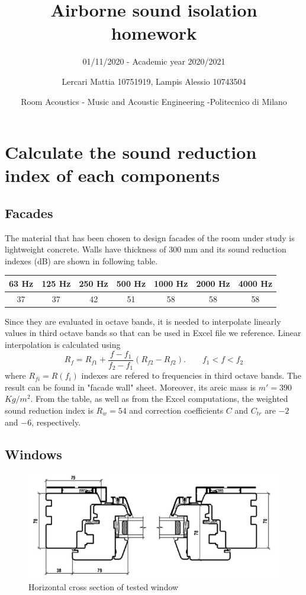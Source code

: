 \documentclass[]{scrartcl}
\title{Airborne sound isolation homework}
\date{Room Acoustics - Music and Acoustic Engineering -Politecnico di Milano}
\author{Lercari Mattia 10751919, Lampis Alessio 10743504}
\subtitle{01/11/2020 - Academic year 2020/2021}
\begin{document}
\maketitle

\section{Calculate the sound reduction index of each components}
\subsection{Facades}
The material that has been chosen to design facades of the room under study is lightweight concrete. Walls have thickness of $300$ mm and its sound reduction indexes (dB) are shown in following table. 
\begin{tabular}{|c|c|c|c|c|c|c|}
	\hline
	63 Hz & 125 Hz & 250 Hz & 500 Hz & 1000 Hz & 2000 Hz & 4000 Hz \\
	\hline
	37 & 37 & 42 & 51 & 58 & 58 & 58 \\
	\hline
\end{tabular} Since they are evaluated in octave bands, it is needed to interpolate linearly values in third octave bands so that can be used in Excel file we reference. Linear interpolation is calculated using 
\begin{equation}
	R_f = R_{f1} + \frac{f - f_1}{f_2 - f_1}(R_{f2} - R_{f2}). \quad \quad  f_1<f<f_2
\end{equation} where $R_{fi} = R(f_i)$ indexes are refered to frequencies in third octave bands. The result can be found in "facade wall" sheet. Moreover, its areic mass is $m'= 390 $ $ Kg/m^2$. From the table, as well as from the Excel computations, the weighted sound reduction index is $R_w = 54$ and correction coefficients $C$ and $C_{tr}$ are $-2$ and $-6$, respectively. 
\subsection{Windows}

\begin{figure}[h]
	\centering
	\includegraphics[width=0.7\linewidth]{windows_profile}
	\caption{Horizontal cross section of tested window}
	\label{fig:windowsprofile}
\end{figure}
\end{document}

